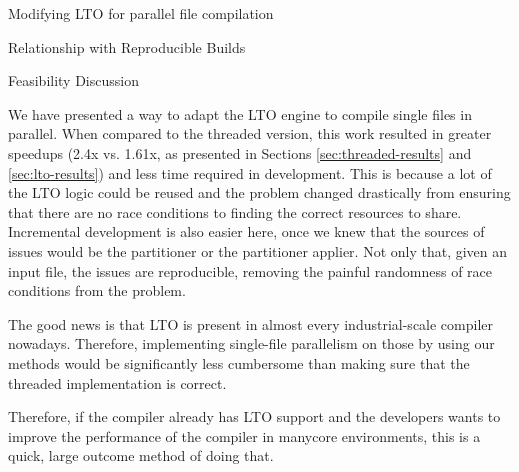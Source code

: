 \begin{section}{Modifying LTO for parallel file compilation}
\begin{subsection}{Relationship with Reproducible Builds}
\end{subsection}

\begin{subsection}{Feasibility Discussion}

We have presented a way to adapt the LTO engine to compile single files in
parallel. When compared to the threaded version, this work resulted in greater
speedups (2.4x vs. 1.61x, as presented in Sections \ref{sec:threaded-results}
and \ref{sec:lto-results}) and less time required in development. This is
because a lot of the LTO logic could be reused and the problem changed
drastically from ensuring that there are no race conditions to finding the
correct resources to share. Incremental development is also easier here, once
we knew that the sources of issues would be the partitioner or the partitioner
applier. Not only that, given an input file, the issues are reproducible,
removing the painful randomness of race conditions from the problem.

The good news is that LTO is present in almost every industrial-scale compiler
nowadays. Therefore, implementing single-file parallelism on those by using our
methods would be significantly less cumbersome than making sure that the
threaded implementation is correct.

Therefore, if the compiler already has LTO support and the developers wants
to improve the performance of the compiler in manycore environments, this is a
quick, large outcome method of doing that.


\end{subsection}
\end{section}

%


